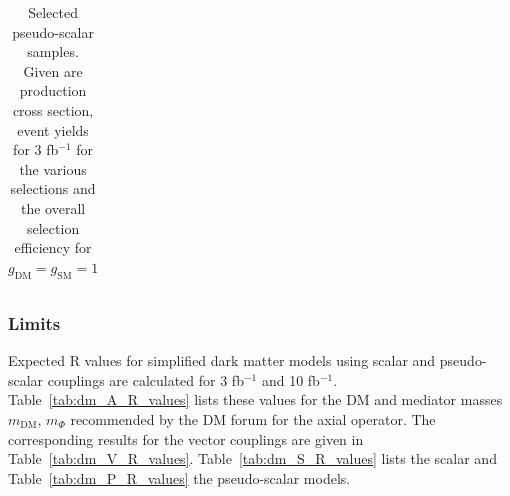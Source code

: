 \begin{table}[h!]
\begin{tabular}{lllllll}
\hline
\end{tabular}
\caption{Selected pseudo-scalar samples. Given are production cross section, event yields for 3 fb$^{-1 }$ for the various selections and the overall selection efficiency for $g_\textrm{DM}=g_\textrm{SM}=1$}
\label{tab:dm_P_g1_3fb}
\end{table}



\subsubsection{Limits}
Expected R values for simplified dark matter models using scalar and pseudo-scalar couplings are calculated for 3 fb$^{-1 }$ and 10 fb$^{-1 }$. Table~\ref{tab:dm_A_R_values} lists these
values for the DM and mediator masses $m_\textrm{DM}$, $m_\Phi$ recommended by the DM forum for the axial operator. The corresponding results for the vector couplings are given in Table~\ref{tab:dm_V_R_values}. Table~\ref{tab:dm_S_R_values} lists the scalar and Table~\ref{tab:dm_P_R_values} the pseudo-scalar models.



